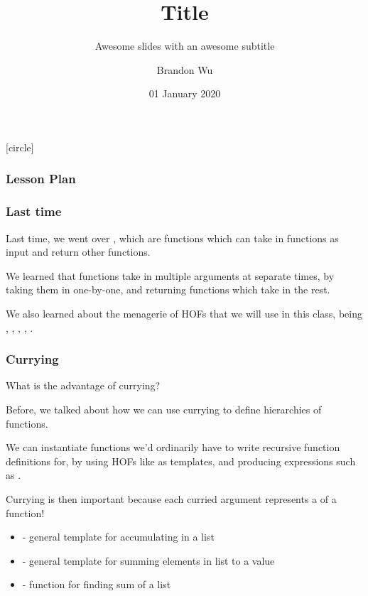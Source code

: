 \documentclass[aspectratio=169]{beamer}
\title{Title} %
\subtitle{Awesome slides with an awesome subtitle} %
\date{01 January 2020} %
\author{Brandon Wu} %
\newif\ifcolorlambda
\begin{document}
\ifweb
    \renewcommand{\pause}{}
\fi

[circle]

{
\begin{frame}[plain]
    \colorlambdatrue
    \titlepage
\end{frame}
}

\begin{frame}[fragile]
  \frametitle{Lesson Plan}

  \tableofcontents
\end{frame}

\begin{frame}[fragile]
  \frametitle{Last time}

  Last time, we went over , which are functions which
  can take in functions as input and return other functions.

  We learned that  functions take in multiple arguments at separate
  times, by taking them in one-by-one, and returning functions which take in the
  rest.

  We also learned about the menagerie of HOFs that we will use in this class, 
  being , , , , . 
\end{frame}


\begin{frame}[fragile]
  \frametitle{Currying}

  What is the advantage of currying?

  Before, we talked about how we can use currying to define hierarchies of functions.
  
  We can instantiate functions we'd ordinarily have to write recursive function definitions
  for, by using HOFs like  as templates, and producing expressions such as
  .

  Currying is then important because each curried argument represents a 
  of a function!

  \begin{itemize}
    \item {} - general template for accumulating in a list
    \item {} - general template for summing elements in list to a value
    \item {} - function for finding sum of a list
  \end{itemize}
\end{frame}
\end{document}
